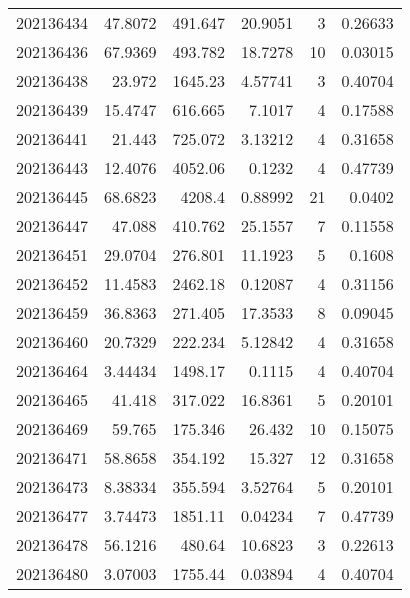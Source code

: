 \begin{tabular}{rrrrrr}
 202136434 &         47.8072  &      491.647  &           20.9051  &           3 & 0.26633 \\
 202136436 &         67.9369  &      493.782  &           18.7278  &          10 & 0.03015 \\
 202136438 &         23.972   &     1645.23   &            4.57741 &           3 & 0.40704 \\
 202136439 &         15.4747  &      616.665  &            7.1017  &           4 & 0.17588 \\
 202136441 &         21.443   &      725.072  &            3.13212 &           4 & 0.31658 \\
 202136443 &         12.4076  &     4052.06   &            0.1232  &           4 & 0.47739 \\
 202136445 &         68.6823  &     4208.4    &            0.88992 &          21 & 0.0402  \\
 202136447 &         47.088   &      410.762  &           25.1557  &           7 & 0.11558 \\
 202136451 &         29.0704  &      276.801  &           11.1923  &           5 & 0.1608  \\
 202136452 &         11.4583  &     2462.18   &            0.12087 &           4 & 0.31156 \\
 202136459 &         36.8363  &      271.405  &           17.3533  &           8 & 0.09045 \\
 202136460 &         20.7329  &      222.234  &            5.12842 &           4 & 0.31658 \\
 202136464 &          3.44434 &     1498.17   &            0.1115  &           4 & 0.40704 \\
 202136465 &         41.418   &      317.022  &           16.8361  &           5 & 0.20101 \\
 202136469 &         59.765   &      175.346  &           26.432   &          10 & 0.15075 \\
 202136471 &         58.8658  &      354.192  &           15.327   &          12 & 0.31658 \\
 202136473 &          8.38334 &      355.594  &            3.52764 &           5 & 0.20101 \\
 202136477 &          3.74473 &     1851.11   &            0.04234 &           7 & 0.47739 \\
 202136478 &         56.1216  &      480.64   &           10.6823  &           3 & 0.22613 \\
 202136480 &          3.07003 &     1755.44   &            0.03894 &           4 & 0.40704 \\

\end{tabular}
